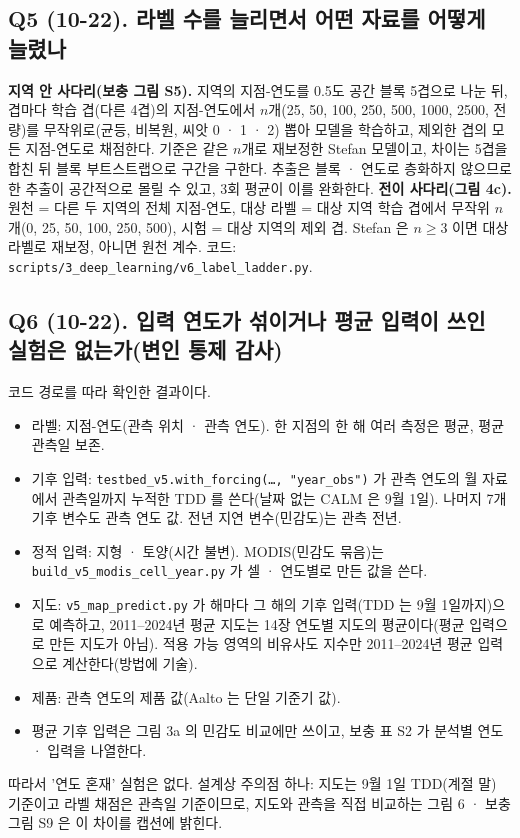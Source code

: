 \documentclass[10pt,a4paper]{article}
\begin{document}
\subsection*{Q5 (10-22). 라벨 수를 늘리면서 어떤 자료를 어떻게 늘렸나}
\textbf{지역 안 사다리(보충 그림 S5).} 지역의 지점-연도를 0.5도 공간 블록 5겹으로 나눈 뒤, 겹마다 학습 겹(다른 4겹)의 지점-연도에서 $n$개(25, 50, 100, 250, 500, 1000, 2500, 전량)를 무작위로(균등, 비복원, 씨앗 0 · 1 · 2) 뽑아 모델을 학습하고, 제외한 겹의 모든 지점-연도로 채점한다. 기준은 같은 $n$개로 재보정한 Stefan 모델이고, 차이는 5겹을 합친 뒤 블록 부트스트랩으로 구간을 구한다. 추출은 블록 · 연도로 층화하지 않으므로 한 추출이 공간적으로 몰릴 수 있고, 3회 평균이 이를 완화한다. \textbf{전이 사다리(그림 4c).} 원천 = 다른 두 지역의 전체 지점-연도, 대상 라벨 = 대상 지역 학습 겹에서 무작위 $n$개(0, 25, 50, 100, 250, 500), 시험 = 대상 지역의 제외 겹. Stefan 은 $n \ge 3$ 이면 대상 라벨로 재보정, 아니면 원천 계수. 코드: \texttt{scripts/3\_deep\_learning/v6\_label\_ladder.py}.

\subsection*{Q6 (10-22). 입력 연도가 섞이거나 평균 입력이 쓰인 실험은 없는가(변인 통제 감사)}
코드 경로를 따라 확인한 결과이다.
\begin{itemize}\setlength{\itemsep}{1pt}
\item 라벨: 지점-연도(관측 위치 · 관측 연도). 한 지점의 한 해 여러 측정은 평균, 평균 관측일 보존.
\item 기후 입력: \texttt{testbed\_v5.with\_forcing(\ldots, "year\_obs")} 가 관측 연도의 월 자료에서 관측일까지 누적한 TDD 를 쓴다(날짜 없는 CALM 은 9월 1일). 나머지 7개 기후 변수도 관측 연도 값. 전년 지연 변수(민감도)는 관측 전년.
\item 정적 입력: 지형 · 토양(시간 불변). MODIS(민감도 묶음)는 \texttt{build\_v5\_modis\_cell\_year.py} 가 셀 · 연도별로 만든 값을 쓴다.
\item 지도: \texttt{v5\_map\_predict.py} 가 해마다 그 해의 기후 입력(TDD 는 9월 1일까지)으로 예측하고, 2011--2024년 평균 지도는 14장 연도별 지도의 평균이다(평균 입력으로 만든 지도가 아님). 적용 가능 영역의 비유사도 지수만 2011--2024년 평균 입력으로 계산한다(방법에 기술).
\item 제품: 관측 연도의 제품 값(Aalto 는 단일 기준기 값).
\item 평균 기후 입력은 그림 3a 의 민감도 비교에만 쓰이고, 보충 표 S2 가 분석별 연도 · 입력을 나열한다.
\end{itemize}
따라서 '연도 혼재' 실험은 없다. 설계상 주의점 하나: 지도는 9월 1일 TDD(계절 말) 기준이고 라벨 채점은 관측일 기준이므로, 지도와 관측을 직접 비교하는 그림 6 · 보충 그림 S9 은 이 차이를 캡션에 밝힌다.
\end{document}

